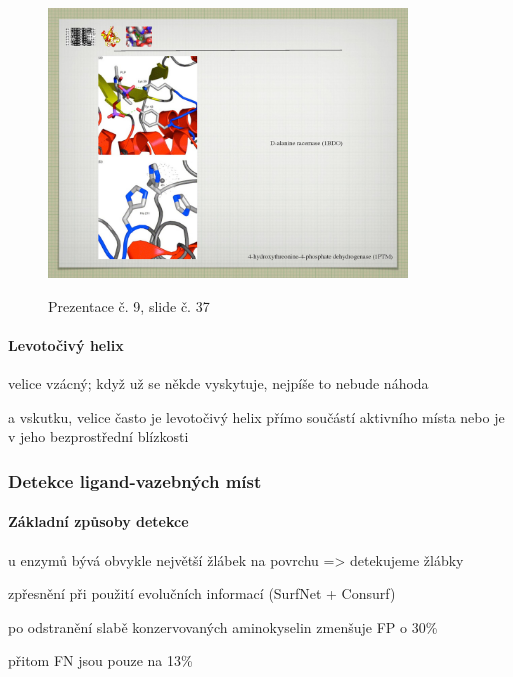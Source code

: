 \documentclass[DIV=8]{scrreprt}
\begin{document}
\begin{figure}
    \caption{Prezentace č. 9, slide č. 37}
    \includegraphics[width=0.85\textwidth]{slides-9/slide-37.jpg}
    \centering
    \label{slides-9-slide-37}
\end{figure}

\paragraph{Levotočivý helix}
\begin{myItemize}[nosep]
    \item velice vzácný; když už se někde vyskytuje, nejpíše to nebude náhoda
    \item a vskutku, velice často je levotočivý helix přímo součástí aktivního místa nebo je v jeho bezprostřední blízkosti
\end{myItemize}



\subsubsection{Detekce ligand-vazebných míst} \label{Detekce ligand-vazebných míst}


\paragraph{Základní způsoby detekce}
\begin{myItemize}[nosep]
    \item u enzymů bývá obvykle největší žlábek na povrchu => detekujeme žlábky
\begin{myItemize}[nosep]
    \item zpřesnění při použití evolučních informací (SurfNet + Consurf)
\begin{myItemize}[nosep]
    \item po odstranění slabě konzervovaných aminokyselin zmenšuje FP o 30\%
    \item přitom FN jsou pouze na 13\%
\end{myItemize}

\end{myItemize}

\end{myItemize}
\end{document}
